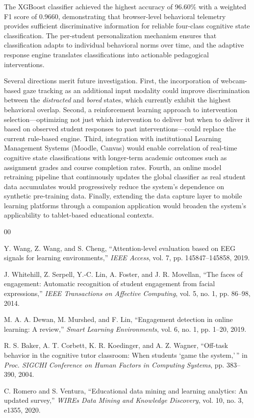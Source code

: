 \documentclass[conference]{IEEEtran}
\begin{document}
The XGBoost classifier achieved the highest accuracy of 96.60\% with a weighted F1 score of 0.9660, demonstrating that browser-level behavioral telemetry provides sufficient discriminative information for reliable four-class cognitive state classification. The per-student personalization mechanism ensures that classification adapts to individual behavioral norms over time, and the adaptive response engine translates classifications into actionable pedagogical interventions.

Several directions merit future investigation. First, the incorporation of webcam-based gaze tracking as an additional input modality could improve discrimination between the \textit{distracted} and \textit{bored} states, which currently exhibit the highest behavioral overlap. Second, a reinforcement learning approach to intervention selection---optimizing not just which intervention to deliver but when to deliver it based on observed student responses to past interventions---could replace the current rule-based engine. Third, integration with institutional Learning Management Systems (Moodle, Canvas) would enable correlation of real-time cognitive state classifications with longer-term academic outcomes such as assignment grades and course completion rates. Fourth, an online model retraining pipeline that continuously updates the global classifier as real student data accumulates would progressively reduce the system's dependence on synthetic pre-training data. Finally, extending the data capture layer to mobile learning platforms through a companion application would broaden the system's applicability to tablet-based educational contexts.


\begin{thebibliography}{00}

Y. Wang, Z. Wang, and S. Cheng, ``Attention-level evaluation based on EEG signals for learning environments,'' \textit{IEEE Access}, vol. 7, pp. 145847--145858, 2019.

J. Whitehill, Z. Serpell, Y.-C. Lin, A. Foster, and J. R. Movellan, ``The faces of engagement: Automatic recognition of student engagement from facial expressions,'' \textit{IEEE Transactions on Affective Computing}, vol. 5, no. 1, pp. 86--98, 2014.

M. A. A. Dewan, M. Murshed, and F. Lin, ``Engagement detection in online learning: A review,'' \textit{Smart Learning Environments}, vol. 6, no. 1, pp. 1--20, 2019.

R. S. Baker, A. T. Corbett, K. R. Koedinger, and A. Z. Wagner, ``Off-task behavior in the cognitive tutor classroom: When students `game the system,'\,'' in \textit{Proc. SIGCHI Conference on Human Factors in Computing Systems}, pp. 383--390, 2004.

C. Romero and S. Ventura, ``Educational data mining and learning analytics: An updated survey,'' \textit{WIREs Data Mining and Knowledge Discovery}, vol. 10, no. 3, e1355, 2020.

\end{thebibliography}
\end{document}
